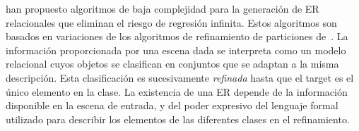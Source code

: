 

\cite{arec2:2008:Areces,arec:usin11} han propuesto algoritmos de baja complejidad
 para la generaci\'on de ER relacionales que eliminan el riesgo de regresi\'on infinita. Estos algoritmos son
basados en variaciones de los algoritmos de refinamiento de particiones
de~\cite{paig:thre87}. La informaci\'on proporcionada por una escena dada
se interpreta como un modelo relacional cuyos objetos se clasifican en
conjuntos que se adaptan a la misma descripci\'on. Esta clasificaci\'on es
sucesivamente \emph{refinada} hasta que el target es el \'unico elemento
en la clase. La existencia de una ER depende
de la informaci\'on disponible en la escena de entrada, y del poder expresivo
del lenguaje formal utilizado para describir los elementos de las
diferentes clases en el refinamiento.\\



